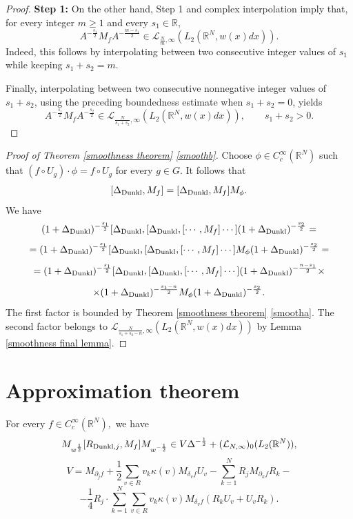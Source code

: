 \documentclass{amsart}
\begin{document}
\begin{proof} {\bf Step 1:}
On the other hand, Step 1 and complex interpolation imply that, for every integer $m\geq1$ and every $s_1\in\mathbb{R},$
$$A^{-\frac{s_1}{2}}M_fA^{-\frac{m-s_1}{2}}\in\mathcal{L}_{\frac{N}{m},\infty}(L_2(\mathbb{R}^N,w(x)dx)).$$
Indeed, this follows by interpolating between two consecutive integer values of $s_1$ while keeping $s_1+s_2=m$.

Finally, interpolating between two consecutive nonnegative integer values of $s_1+s_2$, using the preceding boundedness estimate when $s_1+s_2=0$, yields
$$A^{-\frac{s_1}{2}}M_fA^{-\frac{s_2}{2}}\in\mathcal{L}_{\frac{N}{s_1+s_2},\infty}(L_2(\mathbb{R}^N,w(x)dx)),\qquad s_1+s_2>0.$$
\end{proof}

\begin{proof}[Proof of Theorem \ref{smoothness theorem} \eqref{smoothb}] Choose $\phi\in C^{\infty}_c(\mathbb{R}^N)$ such that $(f\circ U_g)\cdot\phi=f\circ U_g$ for every $g\in G.$ It follows that
$$[\Delta_{{\rm Dunkl}},M_f]=[\Delta_{{\rm Dunkl}},M_f]M_{\phi}.$$
We have
$$(1+\Delta_{{\rm Dunkl}})^{-\frac{s_1}{2}}[\Delta_{{\rm Dunkl}},[\Delta_{{\rm Dunkl}},[\cdots,M_f]\cdots](1+\Delta_{{\rm Dunkl}})^{-\frac{s_2}{2}}=$$
$$=(1+\Delta_{{\rm Dunkl}})^{-\frac{s_1}{2}}[\Delta_{{\rm Dunkl}},[\Delta_{{\rm Dunkl}},[\cdots,M_f]\cdots]M_{\phi}(1+\Delta_{{\rm Dunkl}})^{-\frac{s_2}{2}}=$$
$$=(1+\Delta_{{\rm Dunkl}})^{-\frac{s_1}{2}}[\Delta_{{\rm Dunkl}},[\Delta_{{\rm Dunkl}},[\cdots,M_f]\cdots](1+\Delta_{{\rm Dunkl}})^{-\frac{n-s_1}{2}}\times$$
$$\times (1+\Delta_{{\rm Dunkl}})^{-\frac{s_1-n}{2}}M_{\phi}(1+\Delta_{{\rm Dunkl}})^{-\frac{s_2}{2}}.$$
The first factor is bounded by Theorem \ref{smoothness theorem} \eqref{smootha}. The second factor belongs to $\mathcal{L}_{\frac{N}{s_1+s_2-n},\infty}(L_2(\mathbb{R}^N,w(x)dx))$ by Lemma \ref{smoothness final lemma}.
\end{proof}

\section{Approximation theorem}

\begin{theorem}\label{final approximation theorem} For every $f\in C^{\infty}_c(\mathbb{R}^N),$ we have
$$M_{w^{\frac12}}[R_{{\rm Dunkl},j},M_f]M_{w^{-\frac12}}\in V\Delta^{-\frac12}+(\mathcal{L}_{N,\infty})_0(L_2(\mathbb{R}^N)),$$
$$V=M_{\partial_jf}+\frac12\sum_{v\in R}v_k\kappa(v)M_{\delta_vf}U_v-\sum_{k=1}^NR_jM_{\partial_kf}R_k-$$
$$-\frac14R_j\cdot\sum_{k=1}^N\sum_{v\in R}v_k\kappa(v)M_{\delta_vf}(R_kU_v+U_vR_k).$$
\end{theorem}
\end{document}
